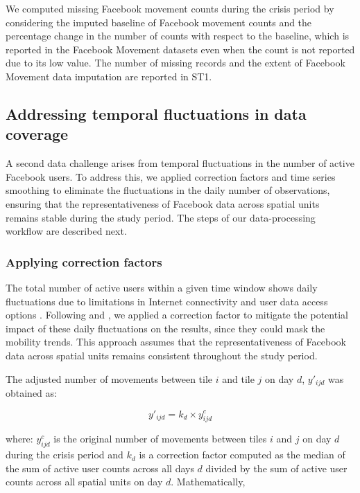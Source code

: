 \documentclass[fleqn,10pt]{wlscirep}
\begin{document}
We computed missing Facebook movement counts during the crisis period by considering the imputed baseline of Facebook movement counts and the percentage change in the number of counts with respect to the baseline, which is reported in the Facebook Movement datasets even when the count is not reported due to its low value. The number of missing records and the extent of Facebook Movement data imputation are reported in ST1.

\subsection*{Addressing temporal fluctuations in data coverage}

A second data challenge arises from temporal fluctuations in the number of active Facebook users. To address this, we applied correction factors and time series smoothing to eliminate the fluctuations in the daily number of observations, ensuring that the representativeness of Facebook data across spatial units remains stable during the study period. The steps of our data-processing workflow are described next.

\subsubsection*{Applying correction factors}

The total number of active users within a given time window shows daily fluctuations due to limitations in Internet connectivity and user data access options \cite{Maas19}. Following \cite{yabe2020} and \cite{duan2024}, we applied a correction factor to mitigate the potential impact of these daily fluctuations on the results, since they could mask the mobility trends. This approach assumes that the representativeness of Facebook data across spatial units remains consistent throughout the study period.

The adjusted number of movements between tile $i$ and tile $j$ on day $d$, $y'_{ijd}$ was obtained as:

\begin{equation}
y'_{ijd} = k_d \times y^c_{ijd}
\end{equation}

where: $y^c_{ijd}$ is the original number of movements between tiles $i$ and $j$ on day $d$ during the crisis period and $k_d$ is a correction factor computed as the median of the sum of active user counts across all days $d$ divided by the sum of active user counts across all spatial units on day $d$. Mathematically,
\end{document}
